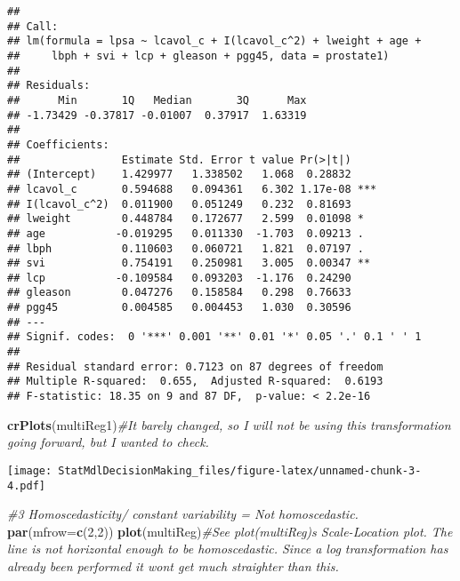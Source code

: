 \documentclass[
]{article}
\newenvironment{Shaded}{\begin{snugshade}}{\end{snugshade}}
\newcommand{\AttributeTok}[1]{\textcolor[rgb]{0.13,0.29,0.53}{#1}}
\newcommand{\CommentTok}[1]{\textcolor[rgb]{0.56,0.35,0.01}{\textit{#1}}}
\newcommand{\DecValTok}[1]{\textcolor[rgb]{0.00,0.00,0.81}{#1}}
\newcommand{\FunctionTok}[1]{\textcolor[rgb]{0.13,0.29,0.53}{\textbf{#1}}}
\newcommand{\NormalTok}[1]{#1}
\begin{document}
\begin{verbatim}
## 
## Call:
## lm(formula = lpsa ~ lcavol_c + I(lcavol_c^2) + lweight + age + 
##     lbph + svi + lcp + gleason + pgg45, data = prostate1)
## 
## Residuals:
##      Min       1Q   Median       3Q      Max 
## -1.73429 -0.37817 -0.01007  0.37917  1.63319 
## 
## Coefficients:
##                Estimate Std. Error t value Pr(>|t|)    
## (Intercept)    1.429977   1.338502   1.068  0.28832    
## lcavol_c       0.594688   0.094361   6.302 1.17e-08 ***
## I(lcavol_c^2)  0.011900   0.051249   0.232  0.81693    
## lweight        0.448784   0.172677   2.599  0.01098 *  
## age           -0.019295   0.011330  -1.703  0.09213 .  
## lbph           0.110603   0.060721   1.821  0.07197 .  
## svi            0.754191   0.250981   3.005  0.00347 ** 
## lcp           -0.109584   0.093203  -1.176  0.24290    
## gleason        0.047276   0.158584   0.298  0.76633    
## pgg45          0.004585   0.004453   1.030  0.30596    
## ---
## Signif. codes:  0 '***' 0.001 '**' 0.01 '*' 0.05 '.' 0.1 ' ' 1
## 
## Residual standard error: 0.7123 on 87 degrees of freedom
## Multiple R-squared:  0.655,  Adjusted R-squared:  0.6193 
## F-statistic: 18.35 on 9 and 87 DF,  p-value: < 2.2e-16
\end{verbatim}

\begin{Shaded}
\begin{Highlighting}[]
      \FunctionTok{crPlots}\NormalTok{(multiReg1)}\CommentTok{\#It barely changed, so I will not be using this transformation going forward, but I wanted to check.}
\end{Highlighting}
\end{Shaded}

\texttt{[image: StatMdlDecisionMaking\_files/figure-latex/unnamed-chunk-3-4.pdf]}

\begin{Shaded}
\begin{Highlighting}[]
    \CommentTok{\#3 Homoscedasticity/ constant variability = Not homoscedastic.}
      \FunctionTok{par}\NormalTok{(}\AttributeTok{mfrow=}\FunctionTok{c}\NormalTok{(}\DecValTok{2}\NormalTok{,}\DecValTok{2}\NormalTok{))}
      \FunctionTok{plot}\NormalTok{(multiReg)}\CommentTok{\#See plot(multiReg)\textquotesingle{}s Scale{-}Location plot. The line is not horizontal enough to be homoscedastic. Since a log transformation has already been performed it won\textquotesingle{}t get much straighter than this.}
\end{Highlighting}
\end{Shaded}
\end{document}
